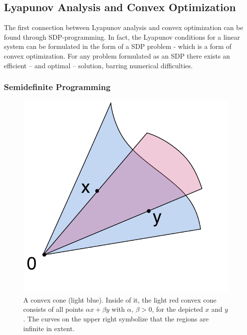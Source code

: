\subsection{Lyapunov Analysis and Convex Optimization}

The first connection between Lyapunov analysis and convex optimization can be
found through \ac{SDP}-programming. In fact, the Lyapunov conditions for a
linear system can be formulated in the form of a \ac{SDP} problem - which is a
form of convex optimization. For any problem formulated as an \ac{SDP} there
exists an efficient -- and optimal -- solution, barring numerical difficulties.

\subsubsection{Semidefinite Programming}

\begin{figure}
  \centering
  \includegraphics[scale=.5]{figures/preliminaries/Convex_cone_illust}
  \caption{A convex cone (light blue). Inside of it, the light red convex cone
    consists of all points \(\alpha x + \beta y \) with \(\alpha,\, \beta > 0\),
    for the depicted \(x\) and \(y\). The curves on the upper right symbolize
    that the regions are infinite in extent.
    \cite{alexandrovConvexConeIllust2019}}
\end{figure}



